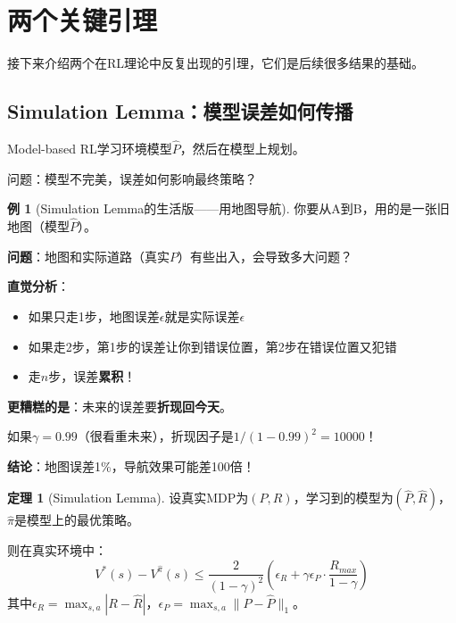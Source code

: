 \documentclass[11pt,a4paper]{article}
\theoremstyle{definition}
\newtheorem{example}{例}[section]
\newtheorem{theorem}{定理}[section]
\begin{document}
\section{两个关键引理}

\begin{plainwords}
接下来介绍两个在RL理论中反复出现的引理，它们是后续很多结果的基础。
\end{plainwords}

\subsection{Simulation Lemma：模型误差如何传播}

\begin{plainwords}
Model-based RL学习环境模型$\hat{P}$，然后在模型上规划。

问题：模型不完美，误差如何影响最终策略？
\end{plainwords}

\begin{example}[Simulation Lemma的生活版——用地图导航]
你要从A到B，用的是一张旧地图（模型$\hat{P}$）。

\textbf{问题}：地图和实际道路（真实$P$）有些出入，会导致多大问题？

\textbf{直觉分析}：
\begin{itemize}
    \item 如果只走1步，地图误差$\epsilon$就是实际误差$\epsilon$
    \item 如果走2步，第1步的误差让你到错误位置，第2步在错误位置又犯错
    \item 走$n$步，误差\textbf{累积}！
\end{itemize}

\textbf{更糟糕的是}：未来的误差要\textbf{折现回今天}。

如果$\gamma = 0.99$（很看重未来），折现因子是$1/(1-0.99)^2 = 10000$！

\textbf{结论}：地图误差1\%，导航效果可能差100倍！
\end{example}

\begin{theorem}[Simulation Lemma]
设真实MDP为$(P, R)$，学习到的模型为$(\hat{P}, \hat{R})$，$\hat{\pi}$是模型上的最优策略。

则在真实环境中：
\[
V^*(s) - V^{\hat{\pi}}(s) \leq \frac{2}{(1-\gamma)^2} \left(\epsilon_R + \gamma \epsilon_P \cdot \frac{R_{max}}{1-\gamma}\right)
\]
其中$\epsilon_R = \max_{s,a}|R - \hat{R}|$，$\epsilon_P = \max_{s,a}\|P - \hat{P}\|_1$。
\end{theorem}
\end{document}
